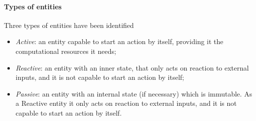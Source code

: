 \paragraph{Types of entities}

Three types of entities have been identified
\begin{itemize}
  \item \textit{Active}: an entity capable to start an action by itself,
  providing it the computational resources it needs;
  \item \textit{Reactive}: an entity with an inner state, that only acts on
reaction to external inputs, and it is not capable to start an action by itself;
  \item \textit{Passive}: an entity with an internal state (if necessary) which
is immutable. As a Reactive entity it only acts on reaction to external inputs,
and it is not capable to start an action by itself.
\end{itemize}



